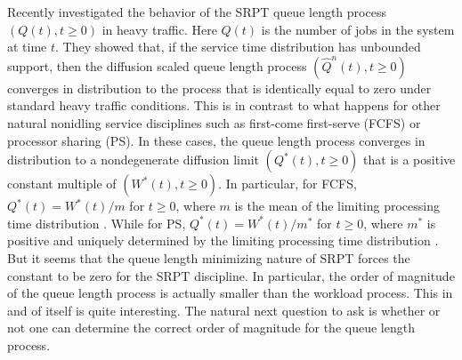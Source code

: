 \documentclass[12pt]{article}
\theoremstyle{plain}
\theoremstyle{definition}
\theoremstyle{remark}
\begin{document}
Recently \cite{gro11} investigated the behavior of the SRPT queue length process $\left(Q(t),t\ge 0\right)$
in heavy traffic.  Here $Q(t)$ is the number of jobs in the system at time $t$.  They showed that, if the service time distribution has unbounded support, then the diffusion scaled queue length process $\left(\widehat{Q}^n(t), t\ge 0\right)$ converges in distribution to the process that is identically equal to zero under standard heavy traffic conditions.
This is in contrast to what happens for other natural nonidling service disciplines such as first-come first-serve (FCFS) or processor sharing (PS).  In these cases, the queue length process converges in distribution to a nondegenerate diffusion limit $(Q^*(t),t\ge 0)$ that is a positive constant multiple of $\left(W^*(t),t\ge 0\right)$.  In particular, for FCFS, $Q^*(t)= W^*(t)/m$ for $t\ge 0$, where $m$ is the mean of the limiting processing time distribution \cite{igl70}.  While for PS, $Q^*(t)= W^*(t)/m^*$ for $t\ge 0$, where $m^*$ is positive and uniquely determined by the limiting processing time distribution \cite{gro04}.  But it seems that the queue length minimizing nature of SRPT forces the constant to be zero for the SRPT discipline. In particular, the order of magnitude of the queue length process is actually smaller than the workload process. This in and of itself is quite interesting.
The natural next question to ask is whether or not one can determine the correct order of magnitude for the queue length process.
\end{document}

